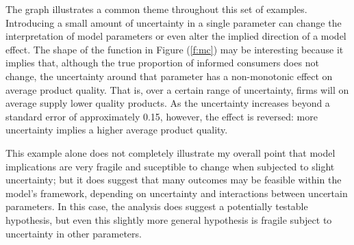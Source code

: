 \documentclass{article}
\begin{document}
The graph illustrates a common theme throughout this set of examples.  Introducing a small amount of uncertainty in a single parameter can change the interpretation of model parameters or even alter the implied direction of a model effect.  The shape of the function in Figure (\ref{f:mc}) may be interesting because it implies that, although the true proportion of informed consumers does not change, the uncertainty around that parameter has a non-monotonic effect on average product quality.  That is, over a certain range of uncertainty, firms will on average supply lower quality products.  As the uncertainty increases beyond a standard error of approximately 0.15, however, the effect is reversed: more uncertainty implies a higher average product quality.  

This example alone does not completely illustrate my overall point that model implications are very fragile and suceptible to change when subjected to slight uncertainty; but it does suggest that many outcomes may be feasible within the model's framework, depending on uncertainty and interactions between uncertain parameters.  In this case, the analysis does suggest a potentially testable hypothesis, but even this slightly more general hypothesis is fragile subject to uncertainty in other parameters.
\end{document}

